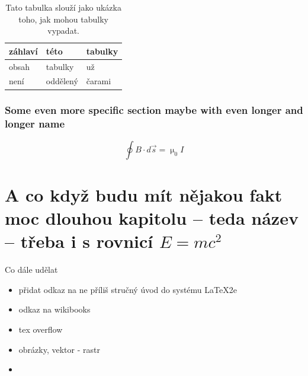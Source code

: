 \documentclass[12pt, a4paper,
 twoside,        %
 openright
]{report}
\begin{document}
\begin{table}
    \caption{Tato tabulka slouží jako ukázka toho, jak mohou tabulky vypadat.}
    \begin{center}
        \begin{tabular}{lll}
            \toprule
            záhlaví& této & tabulky\\
            \midrule
            obsah&tabulky& už\\
            není & oddělený &čarami\\
            \bottomrule
        \end{tabular}
    \end{center}
\end{table}

\subsection{Some even more specific section maybe with even longer and longer name}
\lipsum[1-2]
\begin{equation}
    \oint B \cdot d \vec{s} = \upmu_0 I
\end{equation}



\lipsum[1-3]

\chapter[Třeba to ale nějak zkrátím]{A co když budu mít nějakou fakt moc dlouhou kapitolu -- teda název -- třeba i s rovnicí $E = mc^2$}

Co dále udělat

\begin{itemize}
    \item přidat odkaz na ne příliš stručný úvod do systému \LaTeX2e
    \item odkaz na wikibooks
    \item tex overflow
    \item obrázky, vektor - rastr
    \item 
\end{itemize}
\end{document}
